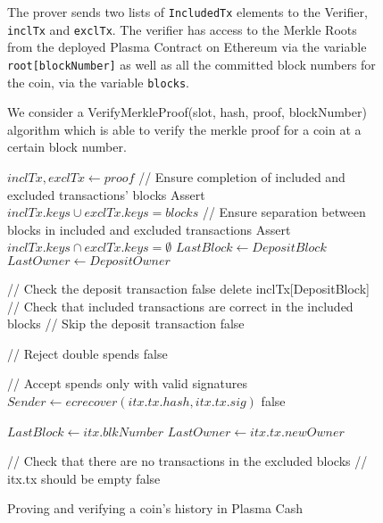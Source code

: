 \begin{figure}
\begin{minipage}{\columnwidth}
\begin{framed}

The prover sends two lists of \texttt{IncludedTx} elements to the Verifier, \texttt{inclTx} and \texttt{exclTx}. The verifier has access to the Merkle Roots from the deployed Plasma Contract on Ethereum via the variable \texttt{root[blockNumber]} as well as all the committed block numbers for the coin, via the variable \texttt{blocks}.

We consider a VerifyMerkleProof(slot, hash, proof, blockNumber) algorithm which is able to verify the merkle proof for a coin at a certain block number.

\begin{algorithmic}[1]
    \State ${inclTx, exclTx} \gets proof$
    \State // Ensure completion of included and excluded transactions' blocks
    \State Assert $inclTx.keys \cup exclTx.keys = blocks$ 
    \State // Ensure separation between blocks in included and excluded transactions
    \State Assert $inclTx.keys \cap exclTx.keys = \emptyset$
    \State $LastBlock \gets DepositBlock$
    \State $LastOwner \gets DepositOwner$

    \State // Check the deposit transaction
        \State \Return false
    \EndIf
    \State delete inclTx[DepositBlock]
    \State // Check that included transactions are correct in the included blocks
     // Skip the deposit transaction
        \State \Return false
    \EndIf

    \State // Reject double spends
        \State \Return false
    \EndIf

    \State // Accept spends only with valid signatures
    \State $Sender \gets ecrecover(itx.tx.hash, itx.tx.sig)$
        \State \Return false
    \EndIf

    \State $LastBlock \gets itx.blkNumber$
    \State $LastOwner \gets itx.tx.newOwner$
    \EndFor

    \State // Check that there are no transactions in the excluded blocks
     // itx.tx should be empty
            \State \Return false
        \EndIf
    \EndFor
\end{algorithmic}


\end{framed}
\end{minipage}
\caption{Proving and verifying a coin's history in Plasma Cash}
\label{fig:transfer_coin}
\end{figure}
